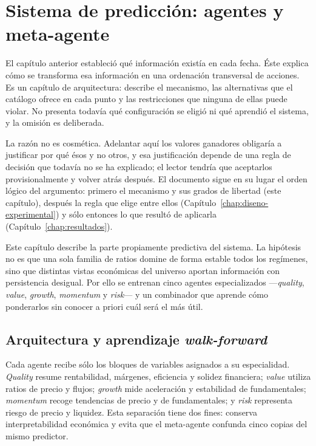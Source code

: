 \chapter{Sistema de predicción: agentes y meta-agente}
\label{chap:agentes}

El capítulo anterior estableció qué información existía en cada fecha. Éste explica cómo se
transforma esa información en una ordenación transversal de acciones. Es un capítulo de
arquitectura: describe el mecanismo, las alternativas que el catálogo ofrece en cada punto y las
restricciones que ninguna de ellas puede violar. No presenta todavía qué configuración se eligió ni
qué aprendió el sistema, y la omisión es deliberada.

La razón no es cosmética. Adelantar aquí los valores ganadores obligaría a justificar por qué ésos y
no otros, y esa justificación depende de una regla de decisión que todavía no se ha explicado; el
lector tendría que aceptarlos provisionalmente y volver atrás después. El documento sigue en su
lugar el orden lógico del argumento: primero el mecanismo y sus grados de libertad (este capítulo),
después la regla que elige entre ellos (Capítulo~\ref{chap:diseno-experimental}) y sólo entonces lo
que resultó de aplicarla (Capítulo~\ref{chap:resultados}).

Este capítulo describe la parte propiamente predictiva del sistema. La hipótesis no es que una sola
familia de ratios domine de forma estable todos los regímenes, sino que distintas vistas económicas
del universo aportan información con persistencia desigual. Por ello se entrenan cinco agentes
especializados ---\textit{quality}, \textit{value}, \textit{growth}, \textit{momentum} y
\textit{risk}--- y un combinador que aprende cómo ponderarlos sin conocer a priori cuál será el
más útil.

\section{Arquitectura y aprendizaje \textit{walk-forward}}

Cada agente recibe sólo los bloques de variables asignados a su especialidad. \textit{Quality}
resume rentabilidad, márgenes, eficiencia y solidez financiera; \textit{value} utiliza ratios de
precio y flujos; \textit{growth} mide aceleración y estabilidad de fundamentales; \textit{momentum}
recoge tendencias de precio y de fundamentales; y \textit{risk} representa riesgo de precio y
liquidez. Esta separación tiene dos fines: conserva interpretabilidad económica y evita que el
meta-agente confunda cinco copias del mismo predictor.


